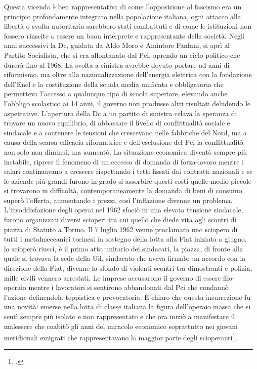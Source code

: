 Questa vicenda è ben rappresentativa di come l'opposizione al fascismo era un principio profondamente integrato nella popolazione italiana, ogni attacco alla libertà o svolta autoritaria sarebbero stati combattuti e di come le istituzioni non fossero riuscite a essere un buon interprete e rappresentante della società.
Negli anni successivi la Dc, guidata da Aldo Moro e Amintore Fanfani, si aprì al Partito Socialista, che si era allontanato dal Pci, aprendo un ciclo politico che durerà fino al 1968.
La svolta a sinistra avrebbe dovuto portare ad anni di riformismo, ma oltre alla nazionalizzazione dell'energia elettrica con la fondazione dell'Enel e la costituzione della scuola media unificata e obbligatoria che permetteva l'accesso a qualunque tipo di scuola superiore, elevando anche l'obbligo scolastico ai 14 anni, il governo non produsse altri risultati deludendo le aspettative.
L'apertura della Dc a un partito di sinistra celava la speranza di trovare un nuovo equilibrio, di abbassare il livello di conflittualità sociale e sindacale e a contenere le tensioni che crescevano nelle fabbriche del Nord, ma a causa della scarsa efficacia riformatrice e dell'esclusione del Pci la conflittualità non solo non diminuì, ma aumentò.
La situazione economica diventò sempre più instabile, riprese il fenomeno di un eccesso di domanda di forza-lavoro mentre i salari continuavano a crescere rispettando i tetti fissati dai contratti nazionali e se le aziende più grandi furono in grado si assorbire questi costi quelle medio-piccole si trovarono in difficoltà, contemporaneamente la domanda di beni di consumo superò l'offerta, aumentando i prezzi, così l'inflazione divenne un problema.
L'insoddisfazione degli operai nel 1962 sfociò in una elevata tensione sindacale, furono organizzati diversi scioperi tra cui  quello che diede vita agli scontri di piazza di Statuto a Torino. 
Il 7 luglio 1962 venne proclamato uno sciopero di tutti i metalmeccanici torinesi in sostegno della lotta alla Fiat iniziata a giugno, lo scioperò riuscì, è il primo atto unitario dei sindacati, la piazza, di fronte alla quale si trovava la sede della Uil, sindacato che aveva firmato un accordo con la direzione della Fiat, divenne lo sfondo di violenti scontri tra dimostranti e polizia, mille civili vennero arrestati. 
Le imprese accusarono il governo di essere filo-operaio mentre i lavoratori si sentirono abbandonati dal Pci che condannò l'azione definendola teppistica e provocatoria.
È chiaro che questa insurrezione fu una novità: emerse nella lotta di classe italiana la figura dell'operaio massa che si sentì sempre più isolato e non rappresentato e che ora iniziò a manifestare il malessere che coabitò gli anni del miracolo economico soprattutto nei giovani meridionali emigrati che rappresentavano la maggior parte degli scioperanti\footcite{Torino}.

